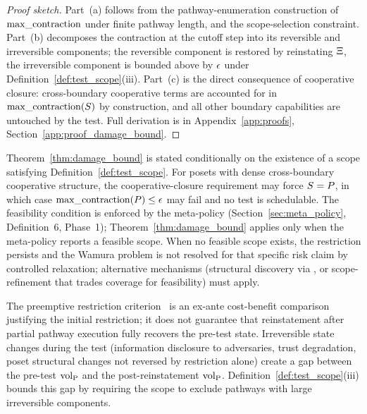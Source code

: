 \begin{proof}[Proof sketch]
Part~(a) follows from the pathway-enumeration construction of
$\mathrm{max\_contraction}$ under finite pathway length, and the scope-selection
constraint.  Part~(b) decomposes the contraction at the cutoff
step into its reversible and irreversible components; the
reversible component is restored by reinstating $\Xi$,
the irreversible component is bounded above by $\epsilon$
under Definition~\ref{def:test_scope}(iii).  Part~(c) is the
direct consequence of cooperative closure: cross-boundary
cooperative terms are accounted for in $\mathrm{max\_contraction}(S)$ by
construction, and all other boundary capabilities are untouched
by the test.  Full derivation is in Appendix~\ref{app:proofs},
Section~\ref{app:proof_damage_bound}.
\end{proof}

\begin{remark}
\label{rem:scope_existence}
Theorem~\ref{thm:damage_bound} is stated conditionally on the
existence of a scope satisfying Definition~\ref{def:test_scope}.
For posets with dense cross-boundary cooperative structure, the
cooperative-closure requirement may force $S = P$, in which
case $\mathrm{max\_contraction}(P) \leq \epsilon$ may fail and no test is
schedulable.  The feasibility condition is enforced by the
meta-policy (Section~\ref{sec:meta_policy}, Definition~6,
Phase~1); Theorem~\ref{thm:damage_bound} applies only when the
meta-policy reports a feasible scope.  When no feasible scope
exists, the restriction persists and the Wamura problem is not
resolved for that specific risk claim by controlled relaxation;
alternative mechanisms (structural discovery via
\citep[Proposition~2]{lasser2026horizon}, or scope-refinement
that trades coverage for feasibility) must apply.
\end{remark}

\begin{remark}
\label{rem:why_not_zero}
The preemptive restriction
criterion~\citep[Proposition~1]{lasser2026horizon} is an ex-ante
cost-benefit comparison justifying the initial restriction; it
does not guarantee that reinstatement after partial pathway
execution fully recovers the pre-test state.  Irreversible state
changes during the test (information disclosure to adversaries,
trust degradation, poset structural changes not reversed by
restriction alone) create a gap between the pre-test ${\operatorname{vol}_{\mathrm{P}}}$ and
the post-reinstatement ${\operatorname{vol}_{\mathrm{P}}}$.
Definition~\ref{def:test_scope}(iii) bounds this gap by
requiring the scope to exclude pathways with large irreversible
components.
\end{remark}

